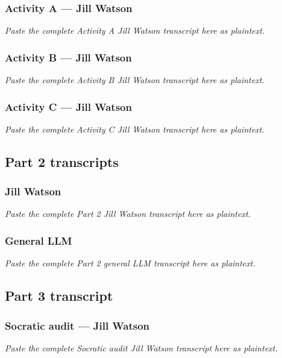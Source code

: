 \documentclass[
	letterpaper, %
]{jdf}
\begin{document}
\subsubsection{Activity A --- Jill Watson}

\textit{Paste the complete Activity A Jill Watson transcript here as plaintext.}

\subsubsection{Activity B --- Jill Watson}

\textit{Paste the complete Activity B Jill Watson transcript here as plaintext.}

\subsubsection{Activity C --- Jill Watson}

\textit{Paste the complete Activity C Jill Watson transcript here as plaintext.}

\subsection{Part 2 transcripts}

\subsubsection{Jill Watson}

\textit{Paste the complete Part 2 Jill Watson transcript here as plaintext.}

\subsubsection{General LLM}

\textit{Paste the complete Part 2 general LLM transcript here as plaintext.}

\subsection{Part 3 transcript}

\subsubsection{Socratic audit --- Jill Watson}

\textit{Paste the complete Socratic audit Jill Watson transcript here as plaintext.}
\end{document}
